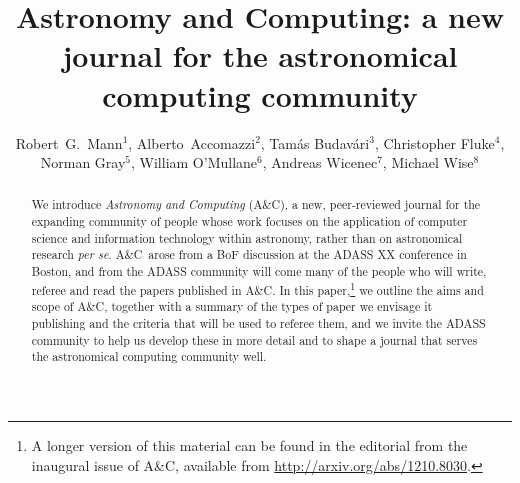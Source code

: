 \documentclass[11pt,twoside]{article}
\newcommand{\ac}{A\&C}
\begin{document}
\title{Astronomy and Computing: a new journal for the astronomical computing community}
\author{
%
Robert~G.~Mann$^1$, Alberto~Accomazzi$^2$, Tam{\'a}s Budav{\'a}ri$^3$, Christopher Fluke$^4$, Norman Gray$^5$, William O'Mullane$^6$, Andreas Wicenec$^7$, Michael Wise$^8$\\
}

\begin{abstract}
We introduce {\em Astronomy and Computing\/} (\ac), a new, peer-reviewed journal for the expanding community of people whose work focuses on the application of computer science and information technology within astronomy, rather than on astronomical research {\em per se\/}. \ac\ arose from a BoF discussion at the ADASS XX conference in Boston, and from the ADASS community will come many of the people who will write, referee and read the papers published in \ac. In this paper,\footnote{A longer version of this material can be found in the editorial from the inaugural issue of \ac, available from \url{http://arxiv.org/abs/1210.8030}.} we outline the aims and scope of \ac, together with a summary of the types of paper we envisage it publishing and the criteria that will be used to referee them, and we invite the ADASS community to help us develop these in more detail and to shape a journal that serves the astronomical computing community well.

\end{abstract}
\end{document}
